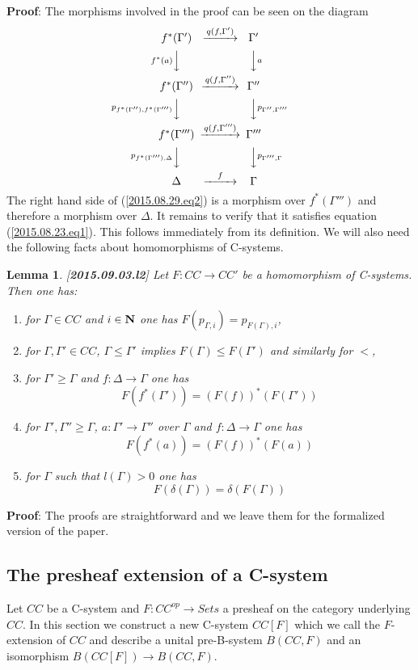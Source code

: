 \documentclass[11pt]{article}
\newenvironment{proof}{{\bf Proof}:}{\vskip 5mm }
\newtheorem{lemma}[proposition]{Lemma}
\newcommand{\llabel}[1]{\label{#1}[{\bf #1}]}
\newcommand{\sr}{\rightarrow}
\newcommand{\nn}{{\bf N\rm}}
\newcommand{\nat}{\nn}
\begin{document}
\begin{proof}
The morphisms involved in the proof can be seen on the diagram
%
$$
\begin{CD}
f^*(\Gamma') @>q(f,\Gamma')>> \Gamma'\\
@Vf^*(a)VV @VVaV\\
f^*(\Gamma'') @>q(f,\Gamma'')>> \Gamma''\\
@Vp_{f^*(\Gamma''),f^*(\Gamma''')}VV @VVp_{\Gamma'',\Gamma'''}V\\
f^*(\Gamma''') @>q(f,\Gamma''')>> \Gamma'''\\
@Vp_{f^*(\Gamma'''),\Delta}VV @VVp_{\Gamma''',\Gamma}V\\
\Delta @>f>> \Gamma
\end{CD}
$$
%
The right hand side of (\ref{2015.08.29.eq2}) is a morphism over $f^*(\Gamma''')$ and therefore a morphism over $\Delta$. It remains to verify that it satisfies equation (\ref{2015.08.23.eq1}). This follows immediately from its definition. 
\end{proof}
%
We will also need the following facts about homomorphisms of C-systems. 
%
\begin{lemma}
\llabel{2015.09.03.l2}
Let $F:CC\sr CC'$ be a homomorphism of C-systems. Then one has:
%
\begin{enumerate}
\item for $\Gamma\in CC$ and $i\in\nat$ one has $F(p_{\Gamma,i})=p_{F(\Gamma),i}$,
\item for $\Gamma,\Gamma'\in CC$, $\Gamma\le \Gamma'$ implies $F(\Gamma)\le F(\Gamma')$ and similarly for $<$,
\item for $\Gamma'\ge \Gamma$ and $f:\Delta\sr \Gamma$ one has
%
$$F(f^*(\Gamma'))=(F(f))^*(F(\Gamma'))$$
%
\item for $\Gamma',\Gamma''\ge \Gamma$, $a:\Gamma'\sr \Gamma''$ over $\Gamma$ and $f:\Delta\sr \Gamma$ one has
%
$$F(f^*(a))=(F(f))^*(F(a))$$
%
\item for $\Gamma$ such that $l(\Gamma)>0$ one has
%
$$F(\delta(\Gamma))=\delta(F(\Gamma))$$
%
\end{enumerate}
\end{lemma}
%
\begin{proof}
The proofs are straightforward and we leave them for the formalized version of the paper.
\end{proof}
%

\subsection{The presheaf extension of a C-system}
%
Let $CC$ be a C-system and $F:CC^{op}\sr Sets$ a presheaf on the category underlying $CC$. In this section we construct a new C-system $CC[F]$ which we call the $F$-extension of $CC$ and describe a unital pre-B-system $B(CC,F)$ and an isomorphism $B(CC[F])\sr B(CC,F)$. 
\end{document}
